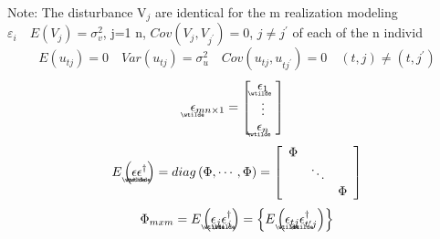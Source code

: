 \documentclass{article}
\begin{document}
Note: The disturbance V$_{j}$ are identical for the m realization modeling $%
\varepsilon _{i}\quad E\left( V_{j}\right) =\sigma _{v}^{2}$, j=1%
n, $Cov\left( V_{j},V_{j^{\prime }}\right) =0$, $j\neq j^{\prime }$ of each
of the n individ%
\begin{equation*}
E\left( u_{tj}\right) =0\quad Var\left( u_{tj}\right) =\sigma _{u}^{2}\quad
Cov\left( u_{tj},u_{tj^{\prime }}\right) =0\quad \left( t,j\right) \neq
\left( t,j^{\prime }\right)
\end{equation*}%
\begin{equation*}
\underaccent{\wtilde}{\epsilon}%
_{mn\times 1}=\left[ 
\begin{array}{c}
\underaccent{\wtilde}{\epsilon}%
_{1} \\ 
\vdots \\ 
\underaccent{\wtilde}{\epsilon}%
_{n}%
\end{array}%
\right]
\end{equation*}%
\begin{equation*}
E\left( 
\underaccent{\wtilde}{\epsilon}%
\underaccent{\wtilde}{\epsilon}%
^{\dagger }\right) =diag\left( \Phi ,\cdots ,\Phi \right) =\left[ 
\begin{array}{ccc}
\Phi &  &  \\ 
& \ddots &  \\ 
&  & \Phi%
\end{array}%
\right]
\end{equation*}%
\begin{equation*}
\Phi _{mxm}=E\left( 
\underaccent{\wtilde}{\epsilon}%
_{j}%
\underaccent{\wtilde}{\epsilon}%
_{j}^{\dagger }\right) =\left\{ E\left( 
\underaccent{\wtilde}{\epsilon}%
_{tj}%
\underaccent{\wtilde}{\epsilon}%
_{t^{\prime }j}^{\dagger }\right) \right\}
\end{equation*}%
\end{document}
